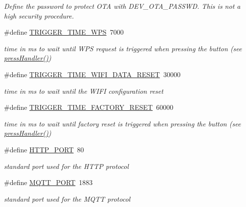\begin{DoxyCompactItemize}
\begin{DoxyCompactList}\small\item\em Define the password to protect O\-T\-A with D\-E\-V\-\_\-\-O\-T\-A\-\_\-\-P\-A\-S\-S\-W\-D. This is not a high security procedure. \end{DoxyCompactList}\item 
\#define \hyperlink{WIFIOnOff_8ino_af0c74d8a61960bcc6f7e06acc3dda4c3}{T\-R\-I\-G\-G\-E\-R\-\_\-\-T\-I\-M\-E\-\_\-\-W\-P\-S}~7000
\begin{DoxyCompactList}\small\item\em time in ms to wait until W\-P\-S request is triggered when pressing the button (see \hyperlink{WIFIOnOff_8ino_acd4d58af93c899ee9a03131727b1cf34}{press\-Handler()}) \end{DoxyCompactList}\item 
\#define \hyperlink{WIFIOnOff_8ino_a65378513c8fda212e6ad80723ebfa2b7}{T\-R\-I\-G\-G\-E\-R\-\_\-\-T\-I\-M\-E\-\_\-\-W\-I\-F\-I\-\_\-\-D\-A\-T\-A\-\_\-\-R\-E\-S\-E\-T}~30000
\begin{DoxyCompactList}\small\item\em time in ms to wait until the W\-I\-F\-I configuration reset \end{DoxyCompactList}\item 
\#define \hyperlink{WIFIOnOff_8ino_a1d71187e9e78d5bd8e38f8bd84edcfbd}{T\-R\-I\-G\-G\-E\-R\-\_\-\-T\-I\-M\-E\-\_\-\-F\-A\-C\-T\-O\-R\-Y\-\_\-\-R\-E\-S\-E\-T}~60000
\begin{DoxyCompactList}\small\item\em time in ms to wait until factory reset is triggered when pressing the button (see \hyperlink{WIFIOnOff_8ino_acd4d58af93c899ee9a03131727b1cf34}{press\-Handler()}) \end{DoxyCompactList}\item 
\#define \hyperlink{WIFIOnOff_8ino_a0906dae4a42c1fef9ec0cd0a5212ed4a}{H\-T\-T\-P\-\_\-\-P\-O\-R\-T}~80
\begin{DoxyCompactList}\small\item\em standard port used for the H\-T\-T\-P protocol \end{DoxyCompactList}\item 
\#define \hyperlink{WIFIOnOff_8ino_aa8632baff6bbb5004385998918f1e6bd}{M\-Q\-T\-T\-\_\-\-P\-O\-R\-T}~1883
\begin{DoxyCompactList}\small\item\em standard port used for the M\-Q\-T\-T protocol \end{DoxyCompactList}\item 

\end{DoxyCompactItemize}
